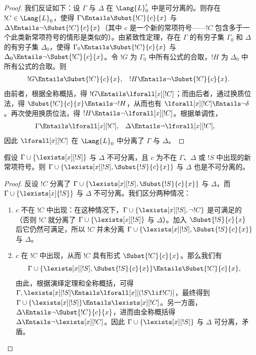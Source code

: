 \documentclass[../../../include/open-logic-section]{subfiles}
\begin{document}
\begin{proof}
我们反证如下：设 $\Gamma$ 与 $\Delta$ 在 $\Lang{L}'_0$ 中是可分离的。则存在 $!C \in \Lang{L}_0$，使得 $\Gamma \Entails
\Subst{!C}{c}{x}$ 与 $\Delta \Entails \lnot \Subst{!C}{c}{x}$（其中 $c$ 是一个新的常项符号——$!C$ 包含多于一个此类新常项符号的情形是类似的）。由紧致性定理，存在 $\Gamma$ 的有穷子集 $\Gamma_0$ 和 $\Delta$ 的有穷子集 $\Delta_0$，使得 $\Gamma_0 \Entails \Subst{!C}{c}{x}$ 与 $\Delta_0 \Entails \lnot \Subst{!C}{c}{x}$。令 $!G$ 为 $\Gamma_0$ 中所有公式的合取，$!H$ 为 $\Delta_0$ 中所有公式的合取。则
\begin{align*}
  !G & \Entails \Subst{!C}{c}{x}, & !H  \Entails \lnot \Subst{!C}{c}{x}.
\end{align*}
由前者，根据全称概括，得 $!G \Entails
\lforall[x][!C]$；而由后者，通过换质位法，得 $\Subst{!C}{c}{x} \Entails \lnot !H$，从而也有 $\lforall[x][!C]
\Entails \lnot \delta$。再次使用换质位法，得 $!H \Entails
\lnot \lforall[x][!C]$。根据单调性，
\begin{align*}
  \Gamma &\Entails \lforall[x][!C], &
  \Delta & \Entails \lnot \lforall[x][!C],
\end{align*}
因此 $\lforall[x][!C]$ 在 $\Lang{L}_0$ 中分离了 $\Gamma$ 与 $\Delta$。
\end{proof}

\begin{lem}
假设 $\Gamma \cup \{ \lexists[x][!S] \}$ 与 $\Delta$ 不可分离，且 $c$ 为不在 $\Gamma$、$\Delta$ 或 $!S$ 中出现的新常项符号。则 $\Gamma \cup \{ \lexists[x][!S], \Subst{!S}{c}{x} \}$ 与 $\Delta$ 也是不可分离的。
\end{lem}

\begin{proof}
反设 $!C$ 分离了 $\Gamma \cup \{
\lexists[x][!S], \Subst{!S}{c}{x}\}$ 与 $\Delta$，而 $\Gamma \cup \{\lexists[x]{!S} \}$ 与 $\Delta$ 不可分离。我们区分两种情况：
\begin{enumerate}
\item $c$ 不在 $!C$ 中出现：在这种情况下，$\Gamma \cup
  \{\lexists[x][!S], \lnot!C \}$ 是可满足的（否则 $!C$ 就分离了 $\Gamma \cup \{\lexists[x][!S] \}$ 与 $\Delta$）。加入 $\Subst{!S}{c}{x}$ 后它仍然可满足，所以 $!C$ 并未分离 $\Gamma \cup \{ \lexists[x][!S], \Subst{!S}{c}{x} \}$ 与 $\Delta$。
\item $c$ 在 $!C$ 中出现，从而 $!C$ 具有形式 $\Subst{!C}{c}{x}$。那么我们有
  \[
  \Gamma \cup \{ \lexists[x][!S], \Subst{!S}{c}{x}\} \Entails \Subst{!C}{c}{x},
  \]
  由此，根据演绎定理和全称概括，可得 $\Gamma, \lexists[x][!S] \Entails \lforall[x][(!S \lif !C)]$，最终得到 $\Gamma
  \cup \{ \lexists[x][!S] \} \Entails \lexists[x][!C]$。另一方面，$\Delta \Entails \lnot \Subst{!C}{c}{x}$，进而由全称概括得 $\Delta \Entails \lnot \lexists[x][!C]$。因此 $\Gamma
  \cup \{\lexists[x][!S] \}$ 与 $\Delta$ 可分离，矛盾。
\end{enumerate}
\end{proof}
\end{document}
